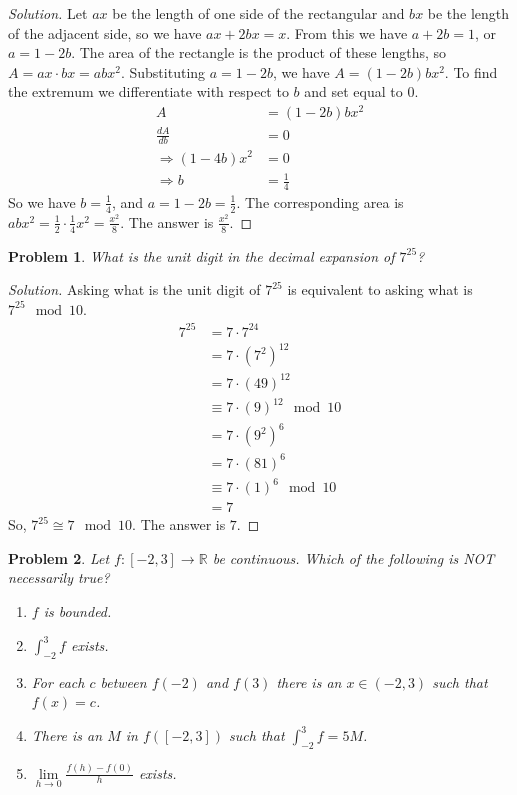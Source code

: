 \documentclass[crop=false,class=book]{standalone}
\theoremstyle{mystyle}
\newtheorem{problem}{Problem}[section]
\begin{document}
\begin{proof}[Solution]
Let $ax$ be the length of one side of the rectangular and $bx$ be the length of the adjacent side, so we have $ax+2bx = x$. From this we have $a+2b = 1$, or $a = 1-2b$. The area of the rectangle is the product of these lengths, so $A = ax\cdot bx = abx^2$. Substituting $a = 1-2b$, we have $A = (1-2b)bx^2$. To find the extremum we differentiate with respect to $b$ and set equal to $0$.
\begin{align}
    A&=(1-2b)bx^2\\
    \frac{dA}{db}&=0\\
    \Rightarrow (1-4b)x^{2}&=0\\
    \Rightarrow b&=\frac{1}{4}
\end{align}
So we have $b = \frac{1}{4}$, and $a = 1-2b = \frac{1}{2}$. The corresponding area is $abx^2 = \frac{1}{2}\cdot \frac{1}{4} x^2 = \frac{x^2}{8}$. The answer is $\frac{x^2}{8}$.
\end{proof}
\begin{problem}
What is the unit digit in the decimal expansion of $7^{25}$?
\end{problem}
\begin{proof}[Solution]
    Asking what is the unit digit of $7^{25}$ is equivalent to asking what is $7^{25} \mod 10$.
\begin{align*}
    7^{25} &= 7\cdot7^{24}\\
    &= 7\cdot(7^2)^{12}\\
    &= 7\cdot(49)^{12}\\
    &\equiv 7\cdot(9)^{12}\mod 10\\
    &= 7\cdot (9^2)^{6}\\
    &= 7 \cdot (81)^{6}\\
    &\equiv 7 \cdot (1)^6 \mod 10\\
    &= 7
\end{align*}
So, $7^{25} \cong 7 \mod 10$. The answer is $7$.
\end{proof}
\begin{problem}
Let $f:[-2,3]\rightarrow \mathbb{R}$ be continuous. Which of the following is NOT necessarily true?
\begin{enumerate}
    \item[A.)] $f$ is bounded.
    \item[B.)] $\int_{-2}^{3}f$ exists.
    \item[C.)] For each $c$ between $f(-2)$ and $f(3)$ there is an $x\in (-2,3)$ such that $f(x) = c$.
    \item[D.)] There is an $M$ in $f([-2,3])$ such that $\int_{-2}^{3}f = 5M$.
    \item $\underset{h\rightarrow 0}\lim \frac{f(h)-f(0)}{h}$ exists.
\end{enumerate}
\end{problem}
\end{document}
